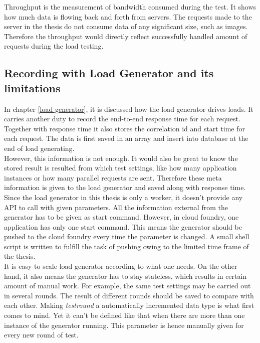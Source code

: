 Throughput is the measurement of bandwidth consumed during the test. It shows how much data is flowing back and forth from servers. The requests made to the server in the thesis do not consume data of any significant size, such as images. Therefore the throughput would directly reflect successfully handled amount of requests during the load testing. \\
\subsection{Recording with Load Generator and its limitations}
 In chapter \ref{load generator}, it is discussed how the load generator drives loads. It carries another duty to record the end-to-end response time for each request. Together with response time it also stores the correlation id and start time for each request. The data is first saved in an array and insert into database at the end of load generating. \\
 However, this information is not enough. It would also be great to know the stored result is resulted from which test settings, like how many application instances or how many parallel requests are sent. Therefore these meta information is given to the load generator and saved along with response time. Since the load generator in this thesis is only a worker, it doesn't provide any API to call with given parameters. All the information external from the generator has to be given as start command. However, in cloud foundry, one application has only one start command. This means the generator should be pushed to the cloud foundry every time the parameter is changed. A small shell script is written to fulfill the task of pushing owing to the limited time frame of the thesis. \\
 
 It is easy to scale load generator according to what one needs. On the other hand, it also means the generator has to stay stateless, which results in certain amount of manual work. For example, the same test settings may be carried out in several rounds. The result of different rounds should be saved to compare with each other. Making \textit{testround }a automatically incremented data type is what first comes to mind. Yet it can't be defined like that when there are more than one instance of the generator running. This parameter is hence manually given for every new round of test.\\
 
